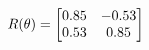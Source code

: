 \documentclass[preview]{standalone}
\begin{document}
\begin{align*}
\special{dvisvgm:raw <g id='unique000'>}R(\theta) = \begin{bmatrix}0.85 & -0.53\\0.53 & 0.85\end{bmatrix}\special{dvisvgm:raw </g>}
\end{align*}
\end{document}
